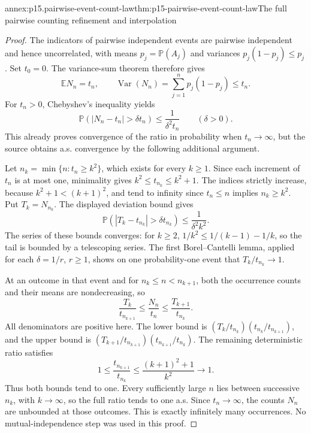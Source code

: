\begin{annexitem}{annex:p15.pairwise-event-count-law}{thm:p15-pairwise-event-count-law}{The full pairwise counting refinement and interpolation}
\begin{proof}
The indicators of pairwise independent events are pairwise independent
and hence uncorrelated, with means \(p_j=\mathbb P(A_j)\)
and variances \(p_j(1-p_j)\leq p_j\). Set \(t_0=0\).
The variance-sum theorem
therefore gives
\[
 \mathbb E N_n=t_n,\qquad
 \operatorname{Var}(N_n)=\sum_{j=1}^n p_j(1-p_j)\leq t_n.
\]
For \(t_n>0\), Chebyshev's inequality yields
\[
 \mathbb P(|N_n-t_n|>\delta t_n)
                  \leq\frac1{\delta^2t_n}\qquad(\delta>0).
\]
This already proves convergence of the ratio in probability when
\(t_n\to\infty\), but the source obtains a.s. convergence
by the following additional argument.

Let \(n_k=\min\{n:t_n\geq k^2\}\), which exists for
every \(k\geq1\). Since each increment of \(t_n\) is at
most one, minimality gives
\(k^2\leq t_{n_k}\leq k^2+1\).
The indices strictly increase, because \(k^2+1<(k+1)^2\),
and tend to infinity since \(t_n\leq n\) implies \(n_k\geq k^2\).
Put \(T_k=N_{n_k}\). The displayed deviation bound gives
\[
 \mathbb P(|T_k-t_{n_k}|>\delta t_{n_k})
                         \leq\frac1{\delta^2k^2}.
\]
The series of these bounds converges: for \(k\geq2\),
\(1/k^2\leq1/(k-1)-1/k\), so the tail is bounded by a
telescoping series. The first Borel--Cantelli lemma, applied
for each \(\delta=1/r\), \(r\geq1\), shows on one
probability-one event that \(T_k/t_{n_k}\to1\).

At an outcome in that event and for \(n_k\leq n<n_{k+1}\),
both the occurrence counts and their means are nondecreasing, so
\[
 \frac{T_k}{t_{n_{k+1}}}
             \leq\frac{N_n}{t_n}
             \leq\frac{T_{k+1}}{t_{n_k}}.
\]
All denominators are positive here. The lower bound is
\((T_k/t_{n_k})(t_{n_k}/t_{n_{k+1}})\), and the upper
bound is \((T_{k+1}/t_{n_{k+1}})(t_{n_{k+1}}/t_{n_k})\).
The remaining deterministic ratio satisfies
\[
 1\leq\frac{t_{n_{k+1}}}{t_{n_k}}
              \leq\frac{(k+1)^2+1}{k^2}\longrightarrow1.
\]
Thus both bounds tend to one. Every sufficiently large \(n\)
lies between successive \(n_k\), with \(k\to\infty\),
so the full ratio tends to one a.s. Since \(t_n\to\infty\),
the counts \(N_n\) are unbounded at those outcomes. This is
exactly infinitely many occurrences. No mutual-independence
step was used in this proof.
\end{proof}
\end{annexitem}

